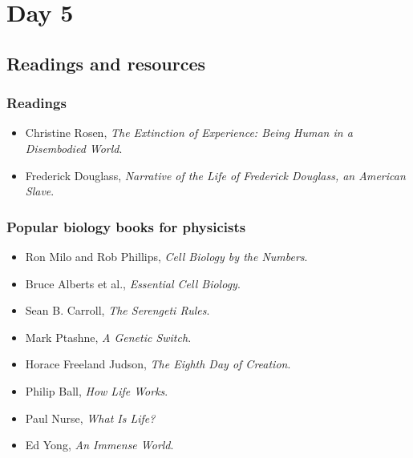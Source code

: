 \section{Day 5}


\subsection{Readings and resources}

\subsubsection{Readings}

\begin{itemize}
    \item Christine Rosen, \textit{The Extinction of Experience: Being Human in a Disembodied World}.
    \item Frederick Douglass, \textit{Narrative of the Life of Frederick Douglass, an American Slave}.
\end{itemize}

\subsubsection{Popular biology books for physicists}

\begin{itemize}
    \item Ron Milo and Rob Phillips, \textit{Cell Biology by the Numbers}.
    \item Bruce Alberts et al., \textit{Essential Cell Biology}.
    \item Sean B. Carroll, \textit{The Serengeti Rules}.
    \item Mark Ptashne, \textit{A Genetic Switch}.
    \item Horace Freeland Judson, \textit{The Eighth Day of Creation}.
    \item Philip Ball, \textit{How Life Works}.
    \item Paul Nurse, \textit{What Is Life?}
    \item Ed Yong, \textit{An Immense World}.
\end{itemize}

